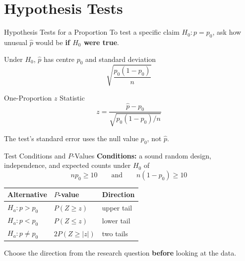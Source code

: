 \documentclass[aspectratio=169,10pt]{beamer}
\begin{document}
\section{Hypothesis Tests}

\begin{frame}{Hypothesis Tests for a Proportion}
To test a specific claim $H_0:p=p_0$, ask how unusual $\hat{p}$ would be \textbf{if $H_0$ were true}.

\vspace{0.2cm}
Under $H_0$, $\hat{p}$ has centre $p_0$ and standard deviation
\[
\sqrt{\frac{p_0(1-p_0)}{n}}
\]

\begin{block}{One-Proportion $z$ Statistic}
\[
z=\frac{\hat{p}-p_0}{\sqrt{p_0(1-p_0)/n}}
\]
\end{block}

The test's standard error uses the null value $p_0$, not $\hat{p}$.
\end{frame}

\begin{frame}{Test Conditions and $P$-Values}
\textbf{Conditions:} a sound random design, independence, and expected counts under $H_0$ of
\[
np_0\ge10\qquad\text{and}\qquad n(1-p_0)\ge10
\]

\begin{center}
\begin{tabular}{lll}
\toprule
\textbf{Alternative} & \textbf{$P$-value} & \textbf{Direction} \\
\midrule
$H_a:p>p_0$ & $P(Z\ge z)$ & upper tail \\
$H_a:p<p_0$ & $P(Z\le z)$ & lower tail \\
$H_a:p\ne p_0$ & $2P(Z\ge|z|)$ & two tails \\
\bottomrule
\end{tabular}
\end{center}

\vspace{0.1cm}
Choose the direction from the research question \textbf{before} looking at the data.
\end{frame}
\end{document}
